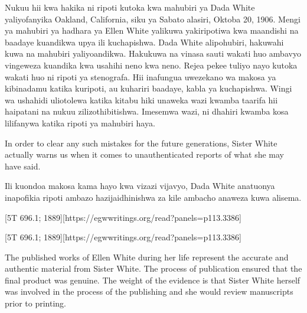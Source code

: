 Nukuu hii kwa hakika ni ripoti kutoka kwa mahubiri ya Dada White yaliyofanyika Oakland, California, siku ya Sabato alasiri, Oktoba 20, 1906. Mengi ya mahubiri ya hadhara ya Ellen White yalikuwa yakiripotiwa kwa maandishi na baadaye kuandikwa upya ili kuchapishwa. Dada White alipohubiri, hakuwahi kuwa na mahubiri yaliyoandikwa. Hakukuwa na vinasa sauti wakati huo ambavyo vingeweza kuandika kwa usahihi neno kwa neno. Rejea pekee tuliyo nayo kutoka wakati huo ni ripoti ya stenografa. Hii inafungua uwezekano wa makosa ya kibinadamu katika kuripoti, au kuhariri baadaye, kabla ya kuchapishwa. Wingi wa ushahidi uliotolewa katika kitabu hiki unaweka wazi kwamba taarifa hii haipatani na nukuu zilizothibitishwa. Imesemwa wazi, ni dhahiri kwamba kosa lilifanywa katika ripoti ya mahubiri haya.


In order to clear any such mistakes for the future generations, Sister White actually warns us when it comes to unauthenticated reports of what she may have said.


Ili kuondoa makosa kama hayo kwa vizazi vijavyo, Dada White anatuonya inapofikia ripoti ambazo hazijaidhinishwa za kile ambacho anaweza kuwa alisema.


[5T 696.1; 1889][https://egwwritings.org/read?panels=p113.3386]


[5T 696.1; 1889][https://egwwritings.org/read?panels=p113.3386]


The published works of Ellen White during her life represent the accurate and authentic material from Sister White. The process of publication ensured that the final product was genuine. The weight of the evidence is that Sister White herself was involved in the process of the publishing and she would review manuscripts prior to printing.


